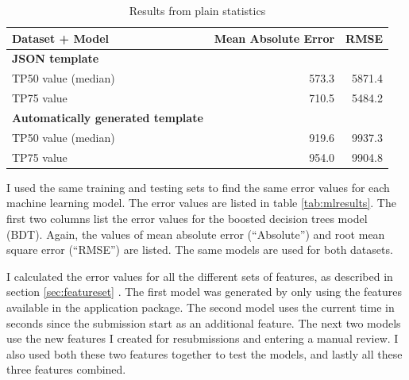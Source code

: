 \begin{table}[htb]
\begin{center}
\begin{tabularx}{\linewidth}{| X | r | r |}
\hline
Dataset + Model & Mean Absolute Error & RMSE \\
\hline
\textbf{JSON template} &  & \\
TP50 value (median)         & 573.3 & 5871.4 \\
TP75 value                  & 710.5 & 5484.2 \\
\hline
\textbf{Automatically generated template} &  & \\
TP50 value (median)         & 919.6 & 9937.3 \\
TP75 value                  & 954.0 & 9904.8 \\
\hline
\end{tabularx}
\end{center}
\caption{Results from plain statistics}
\label{tab:statresults}
\end{table}

I used the same training and testing sets to find the same error values for each machine learning model.
The error values are listed in table \ref{tab:mlresults}.
The first two columns list the error values for the boosted decision trees model (BDT).
Again, the values of mean absolute error (``Absolute'') and root mean square error (``RMSE'') are listed.
The same models are used for both datasets.

I calculated the error values for all the different sets of features, as described in section \ref{sec:featureset}
.
The first model was generated by only using the features available in the application package.
The second model uses the current time in seconds since the submission start as an additional feature.
The next two models use the new features I created for resubmissions and entering a manual review.
I also used both these two features together to test the models, and lastly all these three features combined.

